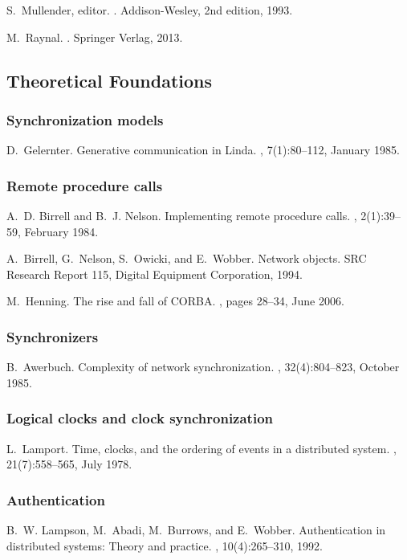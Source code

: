 \documentclass{myproc}
\begin{document}
\w S.~Mullender, editor.
.
\newblock Addison-Wesley, 2nd edition, 1993.

\w M.~Raynal.
.
\newblock Springer Verlag, 2013.

\eit

\subsection{Theoretical Foundations}
\subsubsection{Synchronization models}
\bit
\w D.~Gelernter.
\newblock Generative communication in {Linda}.
,
7(1):80--112, January 1985. 

\eit


\subsubsection{Remote procedure calls}
\bit
\w A.~D. Birrell and B.~J. Nelson.
\newblock Implementing remote procedure calls.
, 2(1):39--59, February
  1984.

\w A.~Birrell, G.~Nelson, S.~Owicki, and E.~Wobber.
\newblock Network objects.
\newblock SRC Research Report 115, Digital Equipment Corporation, 1994.

\w M.~Henning.
\newblock The rise and fall of {CORBA}.
, pages 28--34, June 2006.
\eit

\subsubsection{Synchronizers}
\bit
\w B.~Awerbuch.
\newblock Complexity of network synchronization.
, 32(4):804--823, October 1985.
\eit

\subsubsection{Logical clocks and clock synchronization}
\bit
\w L.~Lamport.
\newblock Time, clocks, and the ordering of events in a distributed system.
, 21(7):558--565, July 1978.
\eit

\subsubsection{Authentication}
\bit
\w B.~W. Lampson, M.~Abadi, M.~Burrows, and E.~Wobber.
\newblock Authentication in distributed systems: Theory and practice.
, 10(4):265--310, 1992.
\eit
\end{document}
